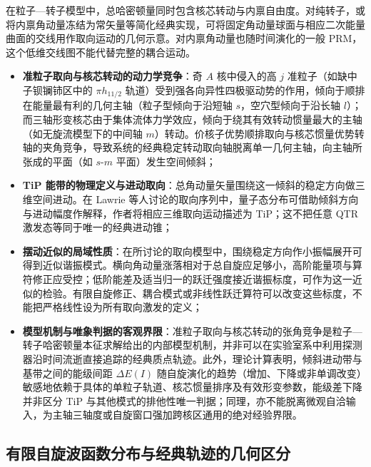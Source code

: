 在粒子—转子模型中，总哈密顿量同时包含核芯转动与内禀自由度。对纯转子，或将内禀角动量冻结为常矢量等简化经典实现，可将固定角动量球面与相应二次能量曲面的交线用作取向运动的几何示意。对内禀角动量也随时间演化的一般 PRM，这个低维交线图不能代替完整的耦合运动。
\begin{itemize}
\item \textbf{准粒子取向与核芯转动的动力学竞争}：奇 $A$ 核中侵入的高 $j$ 准粒子（如缺中子钡镧铈区中的 $\pi h_{11/2}$ 轨道）受到强各向异性四极驱动势的作用，倾向于顺排在能量最有利的几何主轴（粒子型倾向于沿短轴 $s$，空穴型倾向于沿长轴 $l$）；而三轴形变核芯由于集体流体力学效应，倾向于绕其有效转动惯量最大的主轴（如无旋流模型下的中间轴 $m$）转动。价核子优势顺排取向与核芯惯量优势转轴的夹角竞争，导致系统的经典稳定转动取向轴脱离单一几何主轴，向主轴所张成的平面（如 $s$-$m$ 平面）发生空间倾斜；
\item \textbf{TiP 能带的物理定义与进动取向}：总角动量矢量围绕这一倾斜的稳定方向做三维空间进动。在 Lawrie 等人讨论的取向序列中，量子态分布可借助倾斜方向与进动幅度作解释，作者将相应三维取向运动描述为 TiP；这不把任意 QTR 激发态等同于唯一的经典进动锥；
\item \textbf{摆动近似的局域性质}：在所讨论的取向模型中，围绕稳定方向作小振幅展开可得到近似谐振模式。横向角动量涨落相对于总自旋应足够小，高阶能量项与算符修正应受控；低阶能差及适当归一的跃迁强度接近谐振标度，可作为这一近似的检验。有限自旋修正、耦合模式或非线性跃迁算符可以改变这些标度，不能把严格线性设为所有取向激发的定义；
\item \textbf{模型机制与唯象判据的客观界限}：准粒子取向与核芯转动的张角竞争是粒子—转子哈密顿量本征求解给出的内部模型机制，并非可以在实验室系中利用探测器沿时间流逝直接追踪的经典质点轨迹。此外，理论计算表明，倾斜进动带与基带之间的能级间距 $\Delta E(I)$ 随自旋演化的趋势（增加、下降或非单调改变）敏感地依赖于具体的单粒子轨道、核芯惯量排序及有效形变参数，能级差下降并非区分 TiP 与其他模式的排他性唯一判据；同理，亦不能脱离微观自洽输入，为主轴三轴度或自旋窗口强加跨核区通用的绝对经验界限。
\end{itemize}

\subsection{有限自旋波函数分布与经典轨迹的几何区分}\label{sec:3-4-3}

